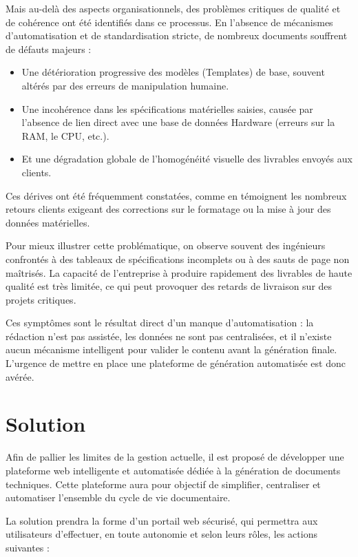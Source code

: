 \documentclass[12pt, a4paper]{report}
\begin{document}
Mais au-delà des aspects organisationnels, des problèmes critiques de qualité et de cohérence ont été identifiés dans ce processus. En l’absence de mécanismes d’automatisation et de standardisation stricte, de nombreux documents souffrent de défauts majeurs :
\begin{itemize}
    \item Une détérioration progressive des modèles (Templates) de base, souvent altérés par des erreurs de manipulation humaine.
    \item Une incohérence dans les spécifications matérielles saisies, causée par l'absence de lien direct avec une base de données Hardware (erreurs sur la RAM, le CPU, etc.).
    \item Et une dégradation globale de l'homogénéité visuelle des livrables envoyés aux clients.
\end{itemize}

Ces dérives ont été fréquemment constatées, comme en témoignent les nombreux retours clients exigeant des corrections sur le formatage ou la mise à jour des données matérielles.

Pour mieux illustrer cette problématique, on observe souvent des ingénieurs confrontés à des tableaux de spécifications incomplets ou à des sauts de page non maîtrisés. La capacité de l'entreprise à produire rapidement des livrables de haute qualité est très limitée, ce qui peut provoquer des retards de livraison sur des projets critiques. 

Ces symptômes sont le résultat direct d’un manque d’automatisation : la rédaction n'est pas assistée, les données ne sont pas centralisées, et il n’existe aucun mécanisme intelligent pour valider le contenu avant la génération finale. L'urgence de mettre en place une plateforme de génération automatisée est donc avérée.

\section{Solution}
Afin de pallier les limites de la gestion actuelle, il est proposé de développer une plateforme web intelligente et automatisée dédiée à la génération de documents techniques. Cette plateforme aura pour objectif de simplifier, centraliser et automatiser l’ensemble du cycle de vie documentaire.

La solution prendra la forme d’un portail web sécurisé, qui permettra aux utilisateurs d’effectuer, en toute autonomie et selon leurs rôles, les actions suivantes :
\end{document}
